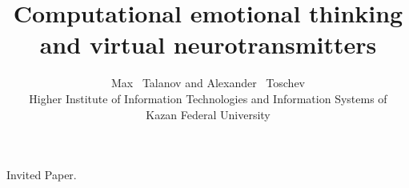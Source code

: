\documentclass{apa6e}
\title{Computational emotional thinking and virtual neurotransmitters}
\author{Max ~Talanov and Alexander ~Toschev\\Higher Institute of Information Technologies and Information Systems of \\Kazan Federal University}
\begin{document}
\begin{center}
Invited Paper.\\
\end{center} 
\maketitle


\end{document}
